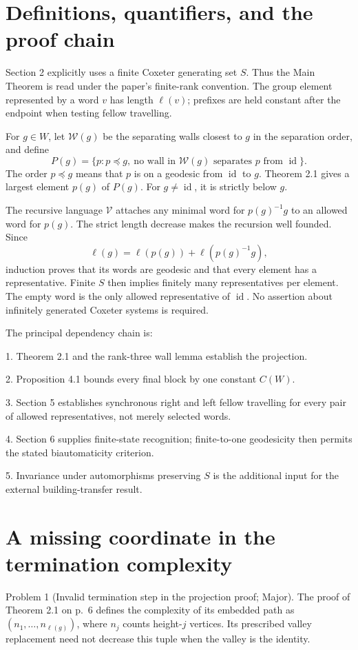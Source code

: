 \documentclass[10pt]{article}
\begin{document}
\section*{Definitions, quantifiers, and the proof chain}
Section 2 explicitly uses a finite Coxeter generating set \(S\). Thus the Main Theorem is read under the paper’s finite-rank convention. The group element represented by a word \(v\) has length \(\ell(v)\); prefixes are held constant after the endpoint when testing fellow travelling.\par
For \(g\in W\), let \(\mathcal W(g)\) be the separating walls closest to \(g\) in the separation order, and define \[P(g)=\{p:p\preceq g,\ 
       \text{no wall in }\mathcal W(g)\text{ separates }p\text{ from }\operatorname{id}\}.\] The order \(p\preceq g\) means that \(p\) is on a geodesic from \(\operatorname{id}\) to \(g\). Theorem 2.1 gives a largest element \(p(g)\) of \(P(g)\). For \(g\ne\operatorname{id}\), it is strictly below \(g\).\par
The recursive language \(\mathcal V\) attaches any minimal word for \(p(g)^{-1}g\) to an allowed word for \(p(g)\). The strict length decrease makes the recursion well founded. Since \[\ell(g)=\ell(p(g))+\ell(p(g)^{-1}g),\] induction proves that its words are geodesic and that every element has a representative. Finite \(S\) then implies finitely many representatives per element. The empty word is the only allowed representative of \(\operatorname{id}\). No assertion about infinitely generated Coxeter systems is required.\par
The principal dependency chain is:\par
1. Theorem 2.1 and the rank-three wall lemma establish the projection.\par
2. Proposition 4.1 bounds every final block by one constant \(C(W)\).\par
3. Section 5 establishes synchronous right and left fellow travelling for every pair of allowed representatives, not merely selected words.\par
4. Section 6 supplies finite-state recognition; finite-to-one geodesicity then permits the stated biautomaticity criterion.\par
5. Invariance under automorphisms preserving \(S\) is the additional input for the external building-transfer result.\par
\section*{A missing coordinate in the termination complexity}
Problem 1 (Invalid termination step in the projection proof; Major).  The proof of Theorem 2.1 on p. 6 defines the complexity of its embedded path as \((n_1,\ldots,n_{\ell(g)})\), where \(n_j\) counts height-\(j\) vertices. Its prescribed valley replacement need not decrease this tuple when the valley is the identity.\par
\end{document}

